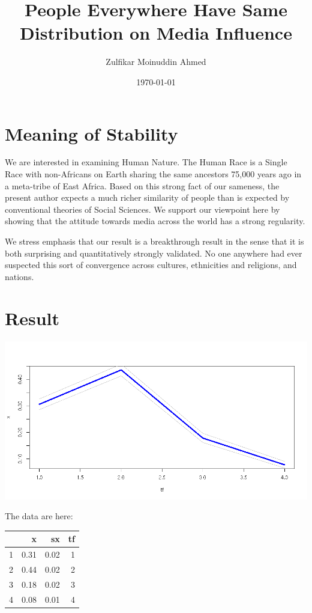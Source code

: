 \documentclass{amsart}
\title{People Everywhere Have Same Distribution on Media Influence}
\author{Zulfikar Moinuddin Ahmed}
\date{\today}
\begin{document}
\maketitle
\section{Meaning of Stability}

We are interested in examining Human Nature.  The Human Race is a Single Race with non-Africans on Earth sharing the same ancestors 75,000 years ago in a meta-tribe of East Africa.  Based on this strong fact of our sameness, the present author expects a much richer similarity of people than is expected by conventional theories of Social Sciences.  We support our viewpoint here by showing that the attitude towards media across the world has a strong regularity.

We stress emphasis that our result is a breakthrough result in the sense that it is both surprising and quantitatively strongly validated.  No one anywhere had ever suspected this sort of convergence across cultures, ethnicities and religions, and nations.

\section{Result}

\includegraphics[scale=0.5]{medop.png}

The data are here:
\begin{table}[ht]
\centering
\begin{tabular}{rrrr}
  \hline
 & x & sx & tf \\ 
  \hline
1 & 0.31 & 0.02 &   1 \\ 
  2 & 0.44 & 0.02 &   2 \\ 
  3 & 0.18 & 0.02 &   3 \\ 
  4 & 0.08 & 0.01 &   4 \\ 
   \hline
\end{tabular}
\end{table}
\end{document}
